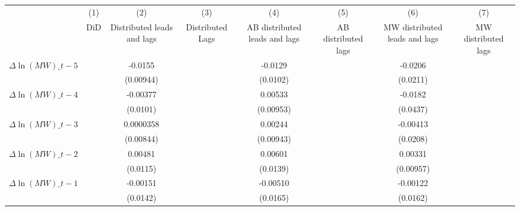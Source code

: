 {
\def\sym#1{\ifmmode^{#1}\else\(^{#1}\)\fi}
\begin{tabular}{l*{7}{c}}
\hline\hline
          &\multicolumn{1}{c}{(1)}&\multicolumn{1}{c}{(2)}&\multicolumn{1}{c}{(3)}&\multicolumn{1}{c}{(4)}&\multicolumn{1}{c}{(5)}&\multicolumn{1}{c}{(6)}&\multicolumn{1}{c}{(7)}\\
          &\multicolumn{1}{c}{DiD}&\multicolumn{1}{c}{Distributed leads and lags}&\multicolumn{1}{c}{Distributed Lags}&\multicolumn{1}{c}{AB distributed leads and lags}&\multicolumn{1}{c}{AB distributed lags}&\multicolumn{1}{c}{MW distributed leads and lags}&\multicolumn{1}{c}{MW distributed lags}\\
\hline
$\Delta \ln(MW)\_{t-5}$&                  &  -0.0155         &                  &  -0.0129         &                  &  -0.0206         &                  \\
          &                  &(0.00944)         &                  & (0.0102)         &                  & (0.0211)         &                  \\
[1em]
$\Delta \ln(MW)\_{t-4}$&                  & -0.00377         &                  &  0.00533         &                  &  -0.0182         &                  \\
          &                  & (0.0101)         &                  &(0.00953)         &                  & (0.0437)         &                  \\
[1em]
$\Delta \ln(MW)\_{t-3}$&                  &0.0000358         &                  &  0.00244         &                  & -0.00413         &                  \\
          &                  &(0.00844)         &                  &(0.00943)         &                  & (0.0208)         &                  \\
[1em]
$\Delta \ln(MW)\_{t-2}$&                  &  0.00481         &                  &  0.00601         &                  &  0.00331         &                  \\
          &                  & (0.0115)         &                  & (0.0139)         &                  &(0.00957)         &                  \\
[1em]
$\Delta \ln(MW)\_{t-1}$&                  & -0.00151         &                  & -0.00510         &                  & -0.00122         &                  \\
          &                  & (0.0142)         &                  & (0.0165)         &                  & (0.0162)         &                  \\

\end{tabular}}
